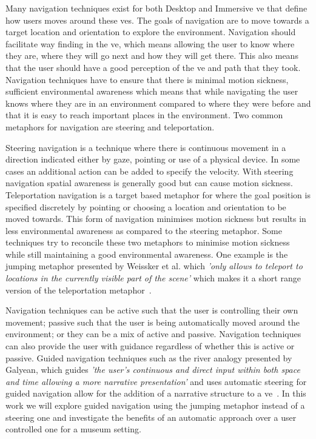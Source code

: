 %
%
\label{Chapter:Introduction}
Many navigation techniques exist for both Desktop and Immersive \acrfull{ve} that define how users moves around these \acrshort{ve}s. The goals of navigation are to move towards a target location and orientation to explore the environment. Navigation should facilitate way finding in the \acrshort{ve}, which means allowing the user to know where they are, where they will go next and how they will get there. This also means that the user should have a good perception of the \acrshort{ve} and path that they took. Navigation techniques have to ensure that there is minimal motion sickness, sufficient environmental awareness which means that while navigating the user knows where they are in an environment compared to where they were before and that it is easy to reach important places in the environment. Two common metaphors for navigation are steering and teleportation.

Steering navigation is a technique where there is continuous movement in a direction indicated either by gaze, pointing or use of a physical device. In some cases an additional action can be added to specify the velocity. With steering navigation spatial awareness is generally good but can cause motion sickness. Teleportation navigation is a target based metaphor for where the goal position is specified discretely by pointing or choosing a location and orientation to be moved towards. This form of navigation minimises motion sickness but results in less environmental awareness as compared to the steering metaphor. Some techniques try to reconcile these two metaphors to minimise motion sickness while still maintaining a good environmental awareness. One example is the jumping metaphor presented by Weissker et al. which \textit{'only allows to teleport to locations in the currently visible part of the scene'} which makes it a short range version of the teleportation metaphor~\cite{Weissker2018}. 

Navigation techniques can be active such that the user is controlling their own movement; passive such that the user is being automatically moved around the environment; or they can be a mix of active and passive. Navigation techniques can also provide the user with guidance regardless of whether this is active or passive. Guided navigation techniques such as the river analogy presented by Galyean, which guides \textit{'the user’s continuous and direct input within both space and time allowing a more narrative presentation'} and uses automatic steering for guided navigation allow for the addition of a narrative structure to a \acrshort{ve}~\cite{Galyean1995}. In this work we will explore guided navigation using the jumping metaphor instead of a steering one and investigate the benefits of an automatic approach over a user controlled one for a museum setting. 

